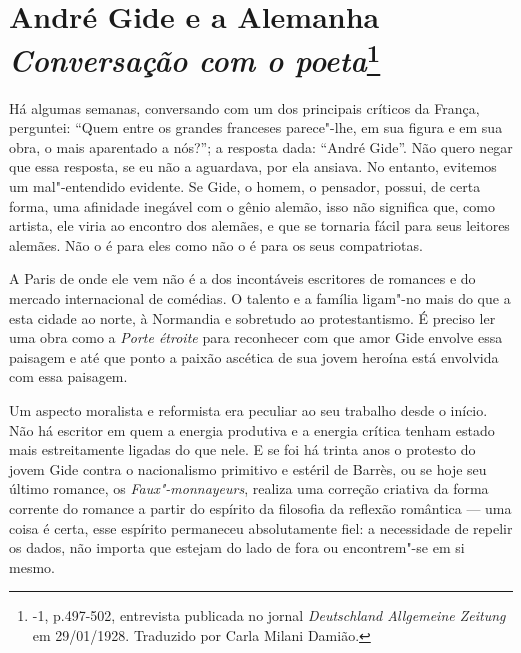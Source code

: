 \chapter*{André Gide e a Alemanha\\
\emph{Conversação com o poeta}\footnote[*]{-1,
  p.497-502, entrevista publicada no jornal \emph{Deutschland
  Allgemeine Zeitung} em 29/01/1928. Traduzido por Carla Milani Damião.}}


Há algumas semanas, conversando com um dos principais críticos da
França, perguntei: ``Quem entre os grandes franceses parece"-lhe, em sua
figura e em sua obra, o mais aparentado a nós?''; a resposta dada:
``André Gide''. Não quero negar que essa resposta, se eu não a
aguardava, por ela ansiava. No entanto, evitemos um mal"-entendido
evidente. Se Gide, o homem, o pensador, possui, de certa forma, uma
afinidade inegável com o gênio alemão, isso não significa que, como
artista, ele viria ao encontro dos alemães, e que se tornaria fácil para
seus leitores alemães. Não o é para eles como não o é para os seus
compatriotas.

A Paris de onde ele vem não é a dos incontáveis ​​escritores de romances
e do mercado internacional de comédias. O talento e a família ligam"-no
mais do que a esta cidade ao norte, à Normandia e sobretudo ao
protestantismo. É preciso ler uma obra como a \emph{Porte étroite} para
reconhecer com que amor Gide envolve essa paisagem e até que ponto a
paixão ascética de sua jovem heroína está envolvida com essa paisagem.

Um aspecto moralista e reformista era peculiar ao seu trabalho desde o
início. Não há escritor em quem a energia produtiva e a energia crítica
tenham estado mais estreitamente ligadas do que nele. E se foi há trinta
anos o protesto do jovem Gide contra o nacionalismo primitivo e estéril
de Barrès, ou se hoje seu último romance, os \emph{Faux"-monnayeurs},
realiza uma correção criativa da forma corrente do romance a partir do
espírito da filosofia da reflexão romântica --- uma coisa é certa, esse
espírito permaneceu absolutamente fiel: a necessidade de repelir os
dados, não importa que estejam do lado de fora ou encontrem"-se em si
mesmo.

